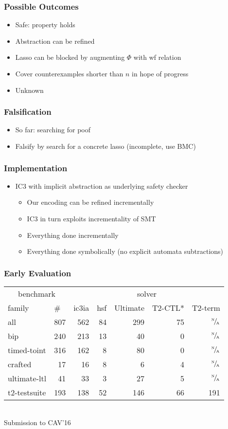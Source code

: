 \documentclass[d3s]{beamer}
\begin{document}
\begin{frame}
\frametitle{Possible Outcomes}
\begin{itemize}
\item Safe: property holds
\item Abstraction can be refined
\item Lasso can be blocked by augmenting $\Phi$ with wf relation
\item Cover counterexamples shorter than $n$ in hope of progress
\item Unknown
\end{itemize}
\end{frame}
\subtitleframe{}
\begin{frame}
\frametitle{Falsification}
\begin{itemize}
\item So far: searching for poof
\item Falsify by search for a concrete lasso (incomplete, use BMC)
\end{itemize}
\end{frame}
\subtitleframe{}
\begin{frame}
\frametitle{Implementation}
\begin{itemize}
\item IC3 with implicit abstraction as underlying safety checker
\begin{itemize}
\item Our encoding can be refined incrementally
\item IC3 in turn exploits incrementality of SMT
\item Everything done incrementally
\item Everything done symbolically (no explicit automata subtractions)
\end{itemize}
\end{itemize}
\end{frame}
\subtitleframe{}
\begin{frame}
\frametitle{Early Evaluation}
\centering
\def\us{\cellcolor{blue!100}}
\def\na{\color{darkgray}$^\text{\tiny N}\!/\!_\text{\tiny A}$}
\def\sum{\cellcolor{gray}}
\begin{tabular}{lr | r r r r r}
\multicolumn{2}{c|}{benchmark} & \multicolumn{5}{c}{solver} \\
\multicolumn{1}{l}{family} & \multicolumn{1}{l|}{\#} & \multicolumn{1}{l}{\us ic3ia} & \multicolumn{1}{l}{hsf} & \multicolumn{1}{l}{Ultimate} & \multicolumn{1}{l}{T2-CTL*} & \multicolumn{1}{l}{T2-term} \\
\sum all & \sum 807 & \us 562 & \sum 84 & \sum 299 & \sum 75 & \sum \na \\
bip          & 240 & \us 213 & 13 &  40 &  0 & \na \\
timed-toint  & 316 & \us 162 &  8 &  80 &  0 & \na \\
crafted      &  17 & \us  16 &  8 &   6 &  4 & \na \\
ultimate-ltl &  41 & \us  33 &  3 &  27 &  5 & \na \\
t2-testsuite & 193 & \us 138 & 52 & 146 & 66 & 191 \\
\end{tabular} \\
\vskip1cm
Submission to CAV'16
\end{frame}
\end{document}

